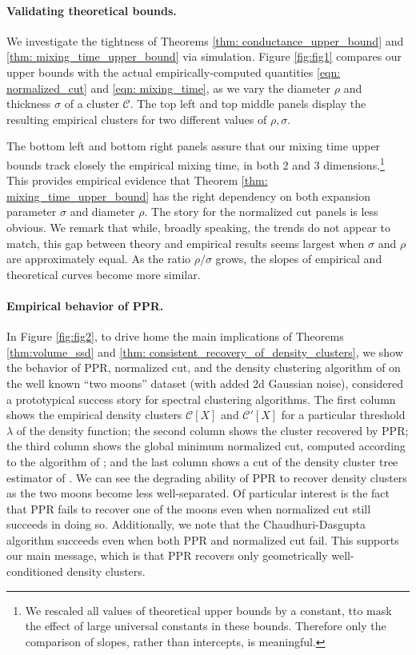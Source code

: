 \documentclass[11pt,twoside]{article}
\newcommand{\1}{\mathbf{1}}
\newcommand{\Xbf}{X}             %
\newcommand{\Cset}{\mathcal{C}}
\begin{document}
\paragraph{Validating theoretical bounds.}  We investigate the tightness of
Theorems \ref{thm: conductance_upper_bound} and \ref{thm:
  mixing_time_upper_bound} via simulation. Figure \ref{fig:fig1} compares our
upper bounds with the actual empirically-computed quantities \eqref{eqn:
  normalized_cut} and \eqref{eqn: mixing_time}, as we vary the diameter $\rho$
and thickness $\sigma$ of a cluster $\Cset$. The top left and top middle panels
display the resulting empirical clusters for two different values of
$\rho,\sigma$. 

The bottom left and bottom right panels assure that our mixing  
time upper bounds track closely the empirical mixing time, in both 2 and 3 
dimensions.\footnote{We rescaled all values of theoretical upper
  bounds by a constant, tto mask the effect of large universal constants
  in these bounds. Therefore only the comparison of slopes, rather than
  intercepts, is meaningful.} This provides empirical evidence that Theorem
\ref{thm: mixing_time_upper_bound} has the right dependency on both expansion
parameter $\sigma$ and diameter $\rho$. The story for the normalized cut panels
is less obvious. We remark that while, broadly speaking, the trends do not
appear to match, this gap between theory and empirical results seems largest
when $\sigma $ and $\rho$ are approximately equal. As the ratio $\rho/\sigma$
grows, the slopes of empirical and theoretical curves become more similar.

\paragraph{Empirical behavior of PPR.} In Figure \ref{fig:fig2}, to drive home
the main implications of Theorems \ref{thm:volume_ssd} and
\ref{thm: consistent_recovery_of_density_clusters}, we show the
behavior of PPR, normalized cut, and the density clustering algorithm of
\citet{chaudhuri2010} on the well known ``two moons'' dataset (with added 2d 
Gaussian noise), considered a prototypical success story for spectral clustering
algorithms. The first column shows the empirical density clusters $\Cset[\Xbf]$
and $\Cset'[\Xbf]$ for a particular threshold $\lambda$ of the density function; the 
second column shows the cluster recovered by PPR; the third column shows the
global minimum normalized cut, computed according to the algorithm of
\citet{szlam2010}; and the last column shows a cut of the density cluster tree
estimator of \citet{chaudhuri2010}.  We can see the degrading ability of PPR to
recover density clusters as the two moons become less well-separated. Of 
particular interest is the fact that PPR fails to recover one of the moons even
when normalized cut still succeeds in doing so. Additionally, we note that the Chaudhuri-Dasgupta algorithm succeeds even when both PPR and normalized cut fail.  This supports our main message, which is that PPR recovers only geometrically well-conditioned density clusters.
\end{document}
